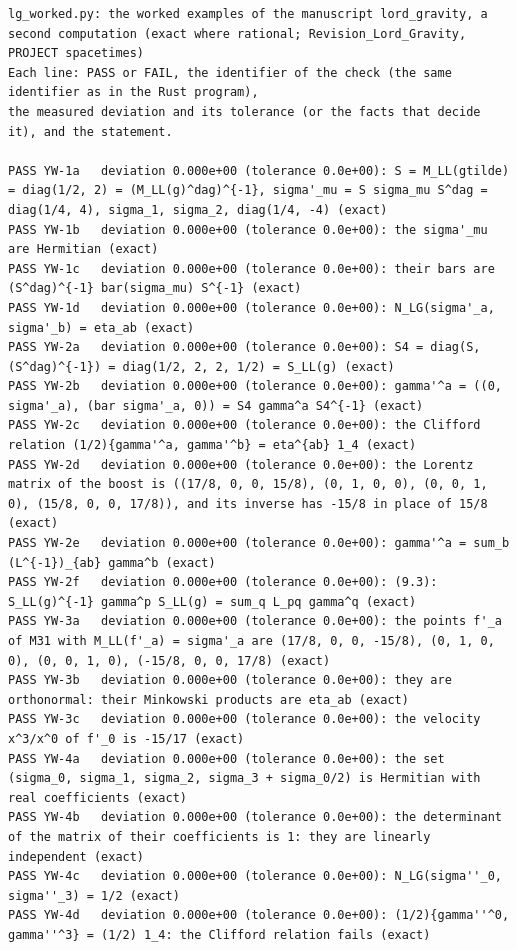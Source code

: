 \documentclass[
  10pt,
]{article}
\begin{document}
\begin{verbatim}
lg_worked.py: the worked examples of the manuscript lord_gravity, a second computation (exact where rational; Revision_Lord_Gravity, PROJECT spacetimes)
Each line: PASS or FAIL, the identifier of the check (the same identifier as in the Rust program),
the measured deviation and its tolerance (or the facts that decide it), and the statement.

PASS YW-1a   deviation 0.000e+00 (tolerance 0.0e+00): S = M_LL(gtilde) = diag(1/2, 2) = (M_LL(g)^dag)^{-1}, sigma'_mu = S sigma_mu S^dag = diag(1/4, 4), sigma_1, sigma_2, diag(1/4, -4) (exact)
PASS YW-1b   deviation 0.000e+00 (tolerance 0.0e+00): the sigma'_mu are Hermitian (exact)
PASS YW-1c   deviation 0.000e+00 (tolerance 0.0e+00): their bars are (S^dag)^{-1} bar(sigma_mu) S^{-1} (exact)
PASS YW-1d   deviation 0.000e+00 (tolerance 0.0e+00): N_LG(sigma'_a, sigma'_b) = eta_ab (exact)
PASS YW-2a   deviation 0.000e+00 (tolerance 0.0e+00): S4 = diag(S, (S^dag)^{-1}) = diag(1/2, 2, 2, 1/2) = S_LL(g) (exact)
PASS YW-2b   deviation 0.000e+00 (tolerance 0.0e+00): gamma'^a = ((0, sigma'_a), (bar sigma'_a, 0)) = S4 gamma^a S4^{-1} (exact)
PASS YW-2c   deviation 0.000e+00 (tolerance 0.0e+00): the Clifford relation (1/2){gamma'^a, gamma'^b} = eta^{ab} 1_4 (exact)
PASS YW-2d   deviation 0.000e+00 (tolerance 0.0e+00): the Lorentz matrix of the boost is ((17/8, 0, 0, 15/8), (0, 1, 0, 0), (0, 0, 1, 0), (15/8, 0, 0, 17/8)), and its inverse has -15/8 in place of 15/8 (exact)
PASS YW-2e   deviation 0.000e+00 (tolerance 0.0e+00): gamma'^a = sum_b (L^{-1})_{ab} gamma^b (exact)
PASS YW-2f   deviation 0.000e+00 (tolerance 0.0e+00): (9.3): S_LL(g)^{-1} gamma^p S_LL(g) = sum_q L_pq gamma^q (exact)
PASS YW-3a   deviation 0.000e+00 (tolerance 0.0e+00): the points f'_a of M31 with M_LL(f'_a) = sigma'_a are (17/8, 0, 0, -15/8), (0, 1, 0, 0), (0, 0, 1, 0), (-15/8, 0, 0, 17/8) (exact)
PASS YW-3b   deviation 0.000e+00 (tolerance 0.0e+00): they are orthonormal: their Minkowski products are eta_ab (exact)
PASS YW-3c   deviation 0.000e+00 (tolerance 0.0e+00): the velocity x^3/x^0 of f'_0 is -15/17 (exact)
PASS YW-4a   deviation 0.000e+00 (tolerance 0.0e+00): the set (sigma_0, sigma_1, sigma_2, sigma_3 + sigma_0/2) is Hermitian with real coefficients (exact)
PASS YW-4b   deviation 0.000e+00 (tolerance 0.0e+00): the determinant of the matrix of their coefficients is 1: they are linearly independent (exact)
PASS YW-4c   deviation 0.000e+00 (tolerance 0.0e+00): N_LG(sigma''_0, sigma''_3) = 1/2 (exact)
PASS YW-4d   deviation 0.000e+00 (tolerance 0.0e+00): (1/2){gamma''^0, gamma''^3} = (1/2) 1_4: the Clifford relation fails (exact)

\end{verbatim}
\end{document}
